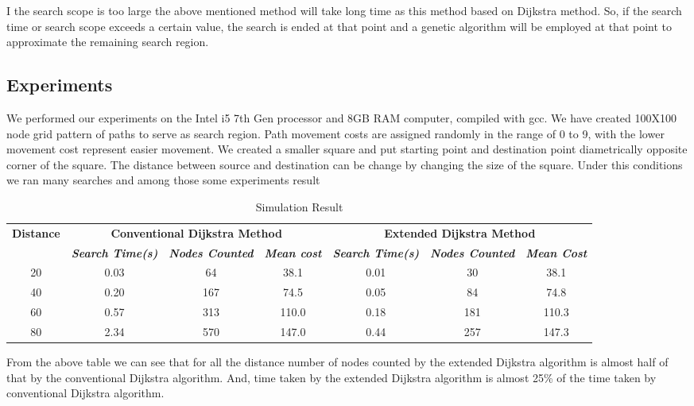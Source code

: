 \documentclass[conference]{IEEEtran}
\begin{document}
I the search scope is too large the above mentioned method will take long time as this method based on Dijkstra method. So, if the search time or search scope exceeds a certain value, the search is ended at that point and a genetic algorithm will be employed at that point to approximate the remaining search region. 

\subsection{Experiments}
We performed our experiments on the Intel i5 7th Gen processor and 8GB RAM computer, compiled with gcc. We have created 100X100 node grid pattern of paths to serve as search region. Path movement costs are assigned randomly in the range of 0 to 9, with the lower movement cost represent easier movement. We created a smaller square and put starting point and destination point diametrically opposite corner of the square. The distance between source and destination can be change by changing the size of the square. Under this conditions we ran many searches and among those some experiments result



\begin{table*}[t]
\caption{Simulation Result}
\begin{center}
\begin{tabular}{|c|c|c|c|c|c|c|}
\hline
\textbf{Distance}&\multicolumn{3}{|c|}{\textbf{Conventional Dijkstra Method}}&\multicolumn{3}{|c|}{\textbf{Extended Dijkstra Method}} \\
\cline{2-7} 
\textbf{} & \textbf{\textit{Search Time(s)}}& \textbf{\textit{Nodes Counted}}& \textbf{\textit{Mean cost}} & \textbf{\textit{Search Time(s)}}& \textbf{\textit{Nodes Counted}}& \textbf{\textit{Mean Cost}} \\
\hline
20 & 0.03 &64 &38.1 &0.01 &30 &38.1\\
40 &0.20 &167 &74.5& 0.05& 84 &74.8\\
60 &0.57 &313 &110.0 &0.18 &181 &110.3\\
80 &2.34 &570 &147.0 &0.44 &257 &147.3\\
\hline

\end{tabular}
\label{tab1}
\end{center}
\end{table*}

From the above table we can see that for all the distance number of nodes counted by the extended Dijkstra algorithm is almost half of that by the conventional Dijkstra algorithm. And, time taken by the extended Dijkstra algorithm is almost 25\% of the time taken by conventional Dijkstra algorithm.
\end{document}
